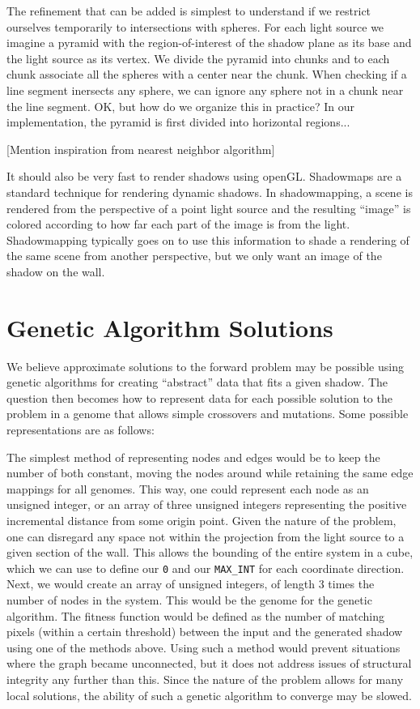 \documentclass[10pt]{article}
\begin{document}
The refinement that can be added is simplest to understand if we restrict ourselves temporarily to intersections with spheres. For each light source we imagine a pyramid with the region-of-interest of the shadow plane as its base and the light source as its vertex. We divide the pyramid into chunks and to each chunk associate all the spheres with a center near the chunk. When checking if a line segment inersects any sphere, we can ignore any sphere not in a chunk near the line segment. OK, but how do we organize this in practice? In our implementation, the pyramid is first divided into horizontal regions...

[Mention inspiration from nearest neighbor algorithm]


It should also be very fast to render shadows using openGL. Shadowmaps are a standard technique for rendering dynamic shadows. In shadowmapping, a scene is rendered from the perspective of a point light source and the resulting ``image'' is colored according to how far each part of the image is from the light. Shadowmapping typically goes on to use this information to shade a rendering of the same scene from another perspective, but we only want an image of the shadow on the wall.

\section{Genetic Algorithm Solutions} \label{GA}
We believe approximate solutions to the forward problem may be possible using genetic algorithms for creating ``abstract'' data that fits a given shadow.  The question then becomes how to represent data for each possible solution to the problem in a genome that allows simple crossovers and mutations.  Some possible representations are as follows: 

The simplest method of representing nodes and edges would be to keep the number of both constant, moving the nodes around while retaining the same edge mappings for all genomes.  This way, one could represent each node as an unsigned integer, or an array of three unsigned integers representing the positive incremental distance from some origin point.  Given the nature of the problem, one can disregard any space not within the projection from the light source to a given section of the wall.  This allows the bounding of the entire system in a cube, which we can use to define our \texttt{0} and our \texttt{MAX\_INT} for each coordinate direction.  Next, we would create an array of unsigned integers, of length 3 times the number of nodes in the system.  This would be the genome for the genetic algorithm.  The fitness function would be defined as the number of matching pixels (within a certain threshold) between the input and the generated shadow using one of the methods above.  Using such a method would prevent situations where the graph became unconnected, but it does not address issues of structural integrity any further than this.  Since the nature of the problem allows for many local solutions, the ability of such a genetic algorithm to converge may be slowed.
\end{document}
